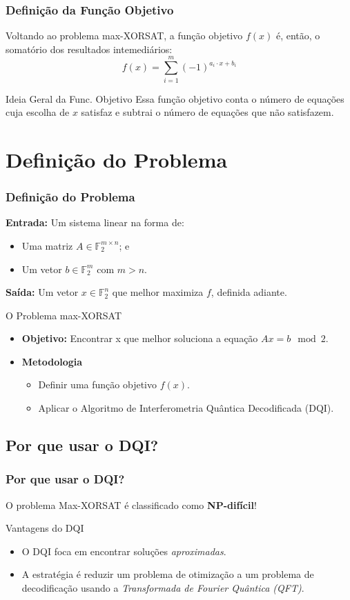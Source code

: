 \documentclass[aspectratio=169]{beamer}
\begin{document}
\begin{frame}
  \frametitle{Definição da Função Objetivo}
  Voltando ao problema max-XORSAT, a função objetivo $f(x)$ é, então, o somatório dos resultados intemediários:
  \[
    f(x)=\sum_{i=1}^m (-1)^{a_i \cdot x + b_i}
  \]

  \vfill
  \begin{block}{Ideia Geral da Func. Objetivo}
    Essa função objetivo conta o número de equações cuja escolha de $x$ satisfaz e subtrai o número de equações que não satisfazem.
  \end{block}
\end{frame}

\section{Definição do Problema}
\begin{frame}
  \frametitle{Definição do Problema}
    \textbf{Entrada:} Um sistema linear na forma de:
    \begin{itemize}
      \item Uma matriz $A \in \mathbb{F}_2^{m \times n}$; e
      \item Um vetor $b \in \mathbb{F}_2^m$ com $m > n$.
    \end{itemize}
    \vfill
    \textbf{Saída:} Um vetor $x \in \mathbb{F}_2^n$ que melhor maximiza $f$, definida adiante.
  \vfill
  \begin{block}{O Problema max-XORSAT}
  \begin{itemize} 
    \item \textbf{Objetivo:} Encontrar x que melhor soluciona a equação $Ax=b \mod2$.
    \item \textbf{Metodologia}
    \begin{itemize}
        \item Definir uma função objetivo $f(x)$.
        \item Aplicar o Algoritmo de Interferometria Quântica Decodificada (DQI).
    \end{itemize}
  \end{itemize}
  \end{block}
\end{frame}

\subsection{Por que usar o DQI?}
\begin{frame}
  \frametitle{Por que usar o DQI?}
  O problema Max-XORSAT é classificado como \textbf{NP-difícil}!

  \vfill
  \begin{block}{Vantagens do DQI}
    \begin{itemize}
      \item O DQI foca em encontrar soluções \textit{aproximadas}.
      \item A estratégia é reduzir um problema de otimização a um problema de decodificação usando a \textit{Transformada de Fourier Quântica (QFT)}.
    \end{itemize}
  \end{block}
\end{frame}
\end{document}

